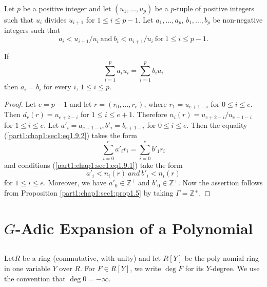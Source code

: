 \begin{prop}\label{part1:chap1:sec1:prop1.9}
  Let $p$ be a positive integer and let $(u_1, \ldots , u_p)$ be a $p$-tuple of positive integers such that $u_i$ divides $u_{i+1}$ for $1 \le i \leq p -1$. Let $a_1, \ldots , a_p$, $b_1 , \ldots , b_p$ be non-negative integers such that
\begin{equation*}
  a_i < u_{i+1} /u_i ~\text{and}~ b_i < u_{i+1} / u_i ~\text{for}~ 1\leq i \leq p-1. \tag{1.9.1}\label{part1:chap1:sec1:eq1.9.1}
\end{equation*}

If 
\begin{equation*}
  \sum^p_{i=1} a_i u_i = \sum^p_{i=1} b_i u_i\tag{1.9.2}\label{part1:chap1:sec1:eq1.9.2}
\end{equation*}
then $a_i = b_i$ for every $i$, $1 \leq i \leq p$.
\end{prop}

\begin{proof}
  Let $e = p-1$ and let $r= (r_0 , \ldots , r_e)$, where $r_1 = u_{e+1-i}$ for $0 \leq i \leq e$. Then $d_r (r)= u_{e+2 -i}$ for $1 \leq i \leq e+1$. Therefore $n_i (r)= u_{e+2-i} / u_{e+1-i}$ for $1 \leq i \leq e$. Let $a'_i = a_{e+1-i}, b'_i = b_{e+1-i}$ for $0 \leq i \leq e$. Then the equality (\ref{part1:chap1:sec1:eq1.9.2}) takes the form
$$
\sum^e_{i=0} a'_i r_i = \sum^e_{i=0} b'_1 r_i
$$
and conditions (\ref{part1:chap1:sec1:eq1.9.1}) take the form
$$
a'_i < n_i (r) ~and ~ b'_i < n_i (r)
$$
for $1 \leq i \leq e$. Moreover, we have $a'_0 \in \mathbb{Z}^+$ and $b'_0 \in \mathbb{Z}^+$. Now the assertion follows from Proposition \ref{part1:chap1:sec1:prop1.5} by taking $\Gamma = \mathbb{Z}^+$.
\end{proof}

\section{$G$-Adic Expansion of a Polynomial} \label{part1:chap1:sec2}

\subsection{}\label{part1:chap1:sec2:ss2.1}
Let\pageoriginale $R$ be a ring (commutative, with unity) and let $R[Y]$ be the poly nomial ring in one variable $Y$ over $R$. For $F \in R [Y]$, we write $\deg F$ for its $Y$-degree. We use the convention that $\deg 0 =- \infty$.

\subsection{}\label{part1:chap1:sec2:ss2.2}

